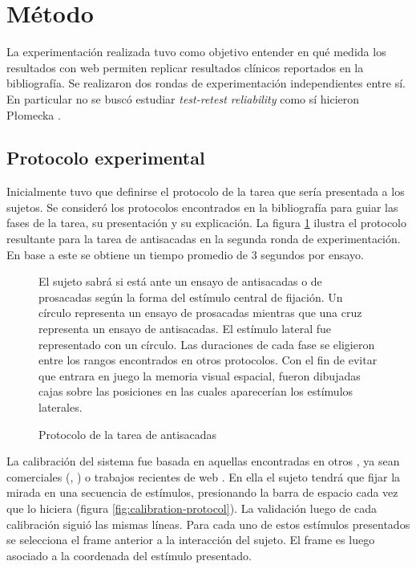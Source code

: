 \section{Método}

La experimentación realizada tuvo como objetivo entender en qué medida los
resultados con \eyetracking web permiten replicar resultados clínicos
reportados en la bibliografía.
Se realizaron dos rondas de experimentación independientes entre sí.
En particular no se buscó estudiar \textit{test-retest reliability} como sí
hicieron P{\l}omecka \etal \cite{plomecka_2020_retest_reliability}.

\subsection{Protocolo experimental}

  Inicialmente tuvo que definirse el protocolo de la tarea que sería presentada
  a los sujetos.
  Se consideró los protocolos encontrados en la bibliografía
  \cite{munoz_2004_look_away, unsworth_2011_distribution_analysis,
  olincy_1997_age_diminishes_performance} para guiar las fases de la tarea, su
  presentación y su explicación.
  La figura \ref{fig:antisaccades-protocol} ilustra el protocolo resultante para
  la tarea de antisacadas en la segunda ronda de experimentación.
  En base a este se obtiene un tiempo promedio de 3 segundos por ensayo.

  \begin{figure}
    \centering

    El sujeto sabrá si está ante un ensayo de antisacadas o de prosacadas según
    la forma del estímulo central de fijación.
    Un círculo representa un ensayo de prosacadas mientras que una cruz
    representa un ensayo de antisacadas.
    El estímulo lateral fue representado con un círculo.
    Las duraciones de cada fase se eligieron entre los rangos encontrados en
    otros protocolos.
    Con el fin de evitar que entrara en juego la memoria visual espacial,
    fueron dibujadas cajas sobre las posiciones en las cuales aparecerían los
    estímulos laterales.

    \caption{Protocolo de la tarea de antisacadas}
    \label{fig:antisaccades-protocol}
  \end{figure}

  La calibración del sistema fue basada en aquellas encontradas en otros
  \eyetrackers, ya sean \eyetrackers comerciales (\tobii, \eyelink) o trabajos
  recientes de \eyetracking web \cite{xu_2015_turker_gaze,
  papoutsaki_2016_webgazer}.
  En ella el sujeto tendrá que fijar la mirada en una secuencia de estímulos,
  presionando la barra de espacio cada vez que lo hiciera (figura
  \ref{fig:calibration-protocol}).
  La validación luego de cada calibración siguió las mismas líneas.
  Para cada uno de estos estímulos presentados se selecciona el frame anterior a
  la interacción del sujeto.
  El frame es luego asociado a la coordenada del estímulo presentado.

